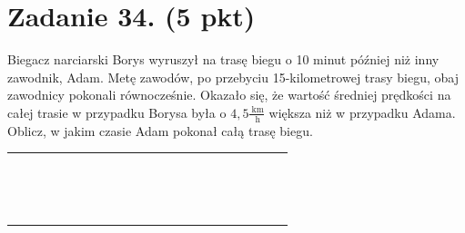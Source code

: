 \documentclass[10pt]{article}
\begin{document}
\section*{Zadanie 34. (5 pkt)}
Biegacz narciarski Borys wyruszył na trasę biegu o 10 minut później niż inny zawodnik, Adam. Metę zawodów, po przebyciu 15-kilometrowej trasy biegu, obaj zawodnicy pokonali równocześnie. Okazało się, że wartość średniej prędkości na całej trasie w przypadku Borysa była o \(4,5 \frac{\mathrm{~km}}{\mathrm{~h}}\) większa niż w przypadku Adama. Oblicz, w jakim czasie Adam pokonał całą trasę biegu.

\begin{center}
\begin{tabular}{|c|c|c|c|c|c|c|c|c|c|c|c|c|c|c|c|c|c|c|c|c|c|}
\hline
 &  &  &  &  &  &  &  &  &  &  &  &  &  &  &  &  &  &  &  &  &  \\
\hline
 &  &  &  &  &  &  &  &  &  &  &  &  &  &  &  &  &  &  &  &  &  \\
\hline
 &  &  &  &  &  &  &  &  &  &  &  &  &  &  &  &  &  &  &  &  &  \\
\hline
 &  &  &  &  &  &  &  &  &  &  &  &  &  &  &  &  &  &  &  &  &  \\
\hline
 &  &  &  &  &  &  &  &  &  &  &  &  &  &  &  &  &  &  &  &  &  \\
\hline
 &  &  &  &  &  &  &  &  &  &  &  &  &  &  &  &  &  &  &  &  &  \\
\hline
 &  &  &  &  &  &  &  &  &  &  &  &  &  &  &  &  &  &  &  &  &  \\
\hline
 &  &  &  &  &  &  &  &  &  &  &  &  &  &  &  &  &  &  &  &  &  \\
\hline
 &  &  &  &  &  &  &  &  &  &  &  &  &  &  &  &  &  &  &  &  &  \\
\hline
 &  &  &  &  &  &  &  &  &  &  &  &  &  &  &  &  &  &  &  &  &  \\
\hline
 &  &  &  &  &  &  &  &  &  &  &  &  &  &  &  &  &  &  &  &  &  \\
\hline
 &  &  &  &  &  &  &  &  &  &  &  &  &  &  &  &  &  &  &  &  &  \\
\hline
 &  &  &  &  &  &  &  &  &  &  &  &  &  &  &  &  &  &  &  &  &  \\
\hline
 &  &  &  &  &  &  &  &  &  &  &  &  &  &  &  &  &  &  &  &  &  \\
\hline
 &  &  &  &  &  &  &  &  &  &  &  &  &  &  &  &  &  &  &  &  &  \\
\hline
 &  &  &  &  &  &  &  &  &  &  &  &  &  &  &  &  &  &  &  &  &  \\

\end{tabular}
\end{center}
\end{document}
